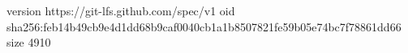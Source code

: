 version https://git-lfs.github.com/spec/v1
oid sha256:feb14b49cb9e4d1dd68b9caf0040cb1a1b8507821fe59b05e74bc7f78861dd66
size 4910
